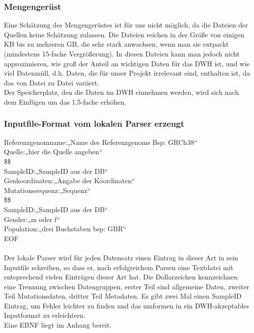 \subsubsection{Mengengerüst}
Eine Schätzung des Mengengerüstes ist für uns nicht möglich, da die Dateien der Quellen keine Schätzung zulassen. Die Dateien reichen in der Größe von einigen KB bis zu mehreren GB, die sehr stark anwachsen, wenn man sie entpackt (mindestens 15-fache Vergrößerung). In diesen Dateien kann man jedoch nicht approximieren, wie groß der Anteil an wichtigen Daten für das DWH ist, und wie viel Datenmüll, d.h. Daten, die für unser Projekt irrelevant sind, enthalten ist, da das von Datei zu Datei variiert.\\
Der Speicherplatz, den die Daten im DWH einnehmen werden, wird sich nach dem Einfügen um das 1,5-fache erhöhen.\\
\subsubsection{Inputfile-Format vom lokalen Parser erzeugt}
Referenzgenomname:„Name des Referenzgenoms Bsp: GRCh38“\\
Quelle:„hier die Quelle angeben“\\
\$\$\\
SampleID:„SampleID aus der DB“\\
Genkoordinaten:„Angabe der Koordinaten“ \\
Mutationssequenz:„Sequenz“\\
\$\$\\
SampleID:„SampleID aus der DB“\\
Gender:„m oder f“\\
Population:„drei Buchstaben bsp: GBR“ \\
EOF\\
\\
Der lokale Parser wird für jeden Datensatz einen Eintrag in dieser Art in sein Inputfile schreiben, so dass er, nach erfolgreichem Parsen eine Textdatei mit entsprechend vielen Einträgen dieser Art hat. Die Dollarzeichen kennzeichnen eine Trennung zwischen Datengruppen, erster Teil sind allgemeine Daten, zweiter Teil Mutationsdaten, dritter Teil Metadaten. Es gibt zwei Mal einen SampleID Eintrag, um Fehler leichter zu finden und das umformen in ein DWH-akzeptables Inputformat zu erleichtern.\\
Eine EBNF liegt im Anhang bereit.\\
